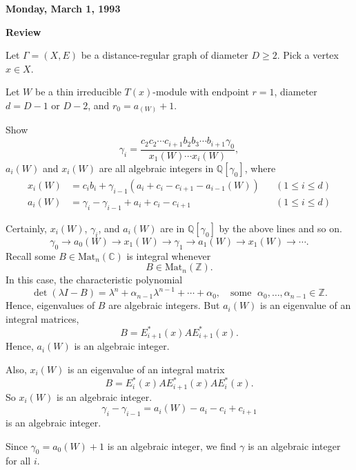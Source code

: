 \documentclass[
]{book}
\theoremstyle{definition}
\theoremstyle{definition}
\theoremstyle{definition}
\theoremstyle{definition}
\theoremstyle{remark}
\begin{document}
\textbf{Monday, March 1, 1993}

\textbf{Review}

Let \(\Gamma = (X, E)\) be a distance-regular graph of diameter \(D\geq 2\). Pick a vertex \(x\in X\).

Let \(W\) be a thin irreducible \(T(x)\)-module with endpoint \(r = 1\), diameter \(d = D-1\) or \(D-2\), and \(r_0 = a_(W) + 1\).

Show
\[\gamma_i = \frac{c_2c_2\cdots c_{i+1}b_2b_3\cdots b_{i+1}\gamma_0}{x_1(W)\cdots x_i(W)},\]
\(a_i(W)\) and \(x_i(W)\) are all algebraic integers in \(\mathbb{Q}[\gamma_0]\), where
\begin{align}
x_i(W) & = c_ib_i + \gamma_{i-1}(a_i + c_i - c_{i+1}-a_{i-1}(W)) && (1\leq i\leq d)\\
a_i(W) & = \gamma_i - \gamma_{i-1} + a_i + c_i - c_{i+1} && (1\leq i\leq d)
\end{align}

Certainly, \(x_i(W)\), \(\gamma_i\), and \(a_i(W)\) are in \(\mathbb{Q}[\gamma_0]\) by the above lines and so on.
\[\gamma_0 \to a_0(W) \to x_1(W) \to \gamma_1 \to a_1(W)\to x_1(W) \to \cdots .\]
Recall some \(B\in \mathrm{Mat}_n(\mathbb{C})\) is integral whenever
\[B\in \mathrm{Mat}_n(\mathbb{Z}).\]
In this case, the characteristic polynomial
\[\det(\lambda I - B) = \lambda^n + \alpha_{n-1}\lambda^{n-1} + \cdots + \alpha_0, \quad \text{some }\; \alpha_0, \ldots, \alpha_{n-1}\in \mathbb{Z}.\]
Hence, eigenvalues of \(B\) are algebraic integers.
But \(a_i(W)\) is an eigenvalue of an integral matrices,
\[B = E^*_{i+1}(x)AE^*_{i+1}(x).\]
Hence, \(a_i(W)\) is an algebraic integer.

Also, \(x_i(W)\) is an eigenvalue of an integral matrix
\[B = E^*_i(x)AE^*_{i+1}(x)AE^*_i(x).\]
So \(x_i(W)\) is an algebraic integer.
\[\gamma_i - \gamma_{i-1} = a_i(W) - a_i - c_i + c_{i+1}\]
is an algebraic integer.

Since \(\gamma_0 = a_0(W) + 1\) is an algebraic integer, we find \(\gamma\) is an algebraic integer for all \(i\).
\end{document}
